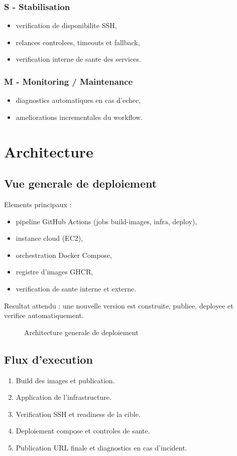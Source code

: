 \documentclass[12pt,a4paper]{report}
\begin{document}
\subsection{S - Stabilisation}
\begin{itemize}
  \item verification de disponibilite SSH,
  \item relances controlees, timeouts et fallback,
  \item verification interne de sante des services.
\end{itemize}

\subsection{M - Monitoring / Maintenance}
\begin{itemize}
  \item diagnostics automatiques en cas d'echec,
  \item ameliorations incrementales du workflow.
\end{itemize}

\chapter{Architecture}
\section{Vue generale de deploiement}
Elements principaux :
\begin{itemize}
  \item pipeline GitHub Actions (jobs build-images, infra, deploy),
  \item instance cloud (EC2),
  \item orchestration Docker Compose,
  \item registre d'images GHCR,
  \item verification de sante interne et externe.
\end{itemize}

Resultat attendu : une nouvelle version est construite, publiee, deployee et verifiee automatiquement.

\begin{figure}[H]
  \centering
  \caption{Architecture generale de deploiement}
\end{figure}

\section{Flux d'execution}
\begin{enumerate}
  \item Build des images et publication.
  \item Application de l'infrastructure.
  \item Verification SSH et readiness de la cible.
  \item Deploiement compose et controles de sante.
  \item Publication URL finale et diagnostics en cas d'incident.
\end{enumerate}
\end{document}
